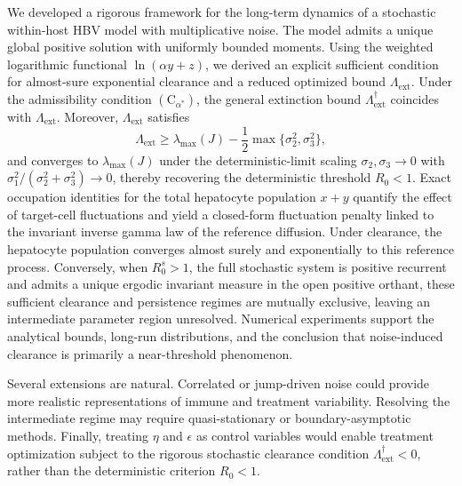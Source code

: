 \documentclass{article}
\newcommand{\Rz}{R_0}
\newcommand{\Rs}{R_0^{s}}
\newcommand{\Lext}{\Lambda_{\mathrm{ext}}}
\newcommand{\Lsharp}{\Lambda_{\mathrm{ext}}^{\dagger}}
\begin{document}
We developed a rigorous framework for the long-term dynamics of a stochastic within-host HBV model with multiplicative noise. The model admits a unique global positive solution with uniformly bounded moments. Using the weighted logarithmic functional $\ln(\alpha y+z)$, we derived an explicit sufficient condition for almost-sure exponential clearance and a reduced optimized bound $\Lext$. Under the admissibility condition $(\mathrm{C}_{\alpha^\ast})$, the general extinction bound $\Lsharp$ coincides with $\Lext$. Moreover, $\Lext$ satisfies
\[
\Lext \geq \lambda_{\max}(J)-\frac12\max\{\sigma_2^2,\sigma_3^2\},
\]
and converges to $\lambda_{\max}(J)$ under the deterministic-limit scaling $\sigma_2,\sigma_3\to0$ with $\sigma_1^2/(\sigma_2^2+\sigma_3^2)\to0$, thereby recovering the deterministic threshold $\Rz<1$. Exact occupation identities for the total hepatocyte population $x+y$ quantify the effect of target-cell fluctuations and yield a closed-form fluctuation penalty linked to the invariant inverse gamma law of the reference diffusion. Under clearance, the hepatocyte population converges almost surely and exponentially to this reference process. Conversely, when $\Rs>1$, the full stochastic system is positive recurrent and admits a unique ergodic invariant measure in the open positive orthant, these sufficient clearance and persistence regimes are mutually exclusive, leaving an intermediate parameter region unresolved. Numerical experiments support the analytical bounds, long-run distributions, and the conclusion that noise-induced clearance is primarily a near-threshold phenomenon.

Several extensions are natural. Correlated or jump-driven noise could provide more realistic representations of immune and treatment variability. Resolving the intermediate regime may require quasi-stationary or boundary-asymptotic methods. Finally, treating $\eta$ and $\epsilon$ as control variables would enable treatment optimization subject to the rigorous stochastic clearance condition $\Lsharp<0$, rather than the deterministic criterion $\Rz<1$.

\end{document}
